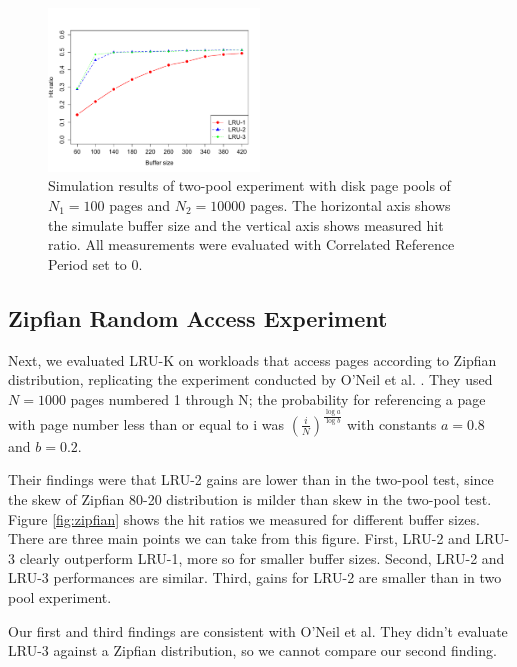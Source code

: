 \begin{figure}[t!]
    \centering
	\includegraphics[width=0.5\textwidth]{./figures/two_pool.pdf}
	\caption{Simulation results of two-pool experiment with disk page pools of $N_1 = 100$ pages and $N_2 = 10000$ pages. The horizontal axis shows the simulate buffer size and the vertical axis shows measured hit ratio. All measurements were evaluated with Correlated Reference Period set to 0.}
	\label{fig:two_pool}
\end{figure}


\subsection{Zipfian Random Access Experiment}

Next, we evaluated LRU-K on workloads that access pages according to Zipfian distribution, replicating the experiment conducted by O'Neil et al. \cite{lruk}. They used $N = 1000$ pages numbered 1 through N; the probability for referencing a page with page number less than or equal to i was $\left(\frac{i}{N}\right)^\frac{\log{a}}{\log{b}}$ with constants $a = 0.8$ and $b = 0.2$.

Their findings were that LRU-2 gains are lower than in the two-pool test, since the skew of Zipfian 80-20 distribution is milder than skew in the two-pool test. Figure \ref{fig:zipfian} shows the hit ratios we measured for different buffer sizes. There are three main points we can take from this figure. First, LRU-2 and LRU-3 clearly outperform LRU-1, more so for smaller buffer sizes. Second, LRU-2 and LRU-3 performances are similar. Third, gains for LRU-2 are smaller than in two pool experiment.

Our first and third findings are consistent with O'Neil et al. They didn't evaluate LRU-3 against a Zipfian distribution, so we cannot compare our second finding.

